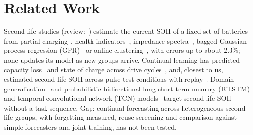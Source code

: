 
\section{Related Work}

Second-life studies (review:~\cite{ref6}) estimate the current SOH of a fixed set of batteries from partial charging~\cite{ref1}, health indicators~\cite{ref2}, impedance spectra~\cite{ref3}, bagged Gaussian process regression (GPR)~\cite{ref4} or online clustering~\cite{ref5}, with errors up to about 2.3\%; none updates its model as new groups arrive. Continual learning has predicted capacity loss~\cite{ref7} and state of charge across drive cycles~\cite{ref8}, and, closest to us, estimated second-life SOH across pulse-test conditions with replay~\cite{tao2026pcl}. Domain generalisation~\cite{ref9} and probabilistic bidirectional long short-term memory (BiLSTM) and temporal convolutional network (TCN) models~\cite{ref10} target second-life SOH without a task sequence. Gap: continual forecasting across heterogeneous second-life groups, with forgetting measured, reuse screening and comparison against simple forecasters and joint training, has not been tested.
